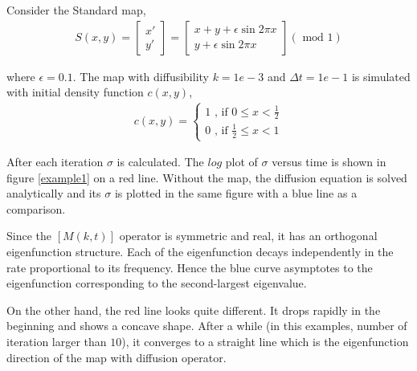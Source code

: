 \begin{example}

Consider the Standard map,
\begin{eqnarray}
\label{standard map}
S(x,y) =      \left[ \begin{array}{c}
                   x'\\
                   y'
                      \end{array} \right]=
              \left[ \begin{array}{cc}
                   x+y+\epsilon \sin{2 \pi x}  \\
                   y+\epsilon \sin{2 \pi x}
                      \end{array} \right]  (\mbox{ mod } 1)
\end{eqnarray}

where $\epsilon = 0.1$. The map with diffusibility $k = 1e-3$ and
$\Delta t = 1e-1 $ is simulated with initial density function
$c(x,y)$,
\begin{eqnarray}
c(x,y) = \left\{ \begin{array}{c}
          1  \mbox{  , if } 0\le x < \frac{1}{2}\\
          0  \mbox{  , if } \frac{1}{2} \le x < 1
          \end{array} \right.
\end{eqnarray}

After each iteration $\sigma$ is calculated. The $log$ plot of
$\sigma$ versus time is shown in figure \ref{example1} on a red
line. Without the map, the diffusion equation is solved analytically
and its $\sigma$ is plotted in the same figure with a blue line as a
comparison.

Since the $[M(k,t)]$ operator is symmetric and real, it has an
orthogonal eigenfunction structure. Each of the eigenfunction decays
independently in the rate proportional to its frequency. Hence the
blue curve asymptotes to the eigenfunction corresponding to the
second-largest eigenvalue.

On the other hand, the red line looks quite different. It drops
rapidly in the beginning and shows a concave shape. After a while
(in this examples, number of iteration larger than $10$), it
converges to a straight line which is the eigenfunction direction of
the map with diffusion operator.


\end{example}
